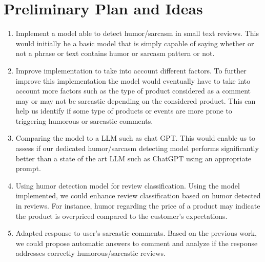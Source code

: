 \documentclass[10pt,twocolumn,letterpaper]{article}
\begin{document}

\section{Preliminary Plan and Ideas}

\begin{enumerate}
    \item Implement a model able to detect humor/sarcasm in small text reviews. This would initially be a basic model that is simply capable of saying whether or not a phrase or text contains humor or sarcasm pattern or not.
    
    \item Improve implementation to take into account different factors. To further improve this implementation the model would eventually have to take into account more factors such as the type of product considered as a comment may or may not be sarcastic depending on the considered product. This can help us identify if some type of products or events are more prone to triggering humorous or sarcastic comments.
    
    \item Comparing the model to a LLM such as chat GPT. This would enable us to assess if our dedicated humor/sarcasm detecting model performs significantly better than a state of the art LLM such as ChatGPT using an appropriate prompt.
    
    \item Using humor detection model for review classification. Using the model implemented, we could enhance review classification based on humor detected in reviews. For instance, humor regarding the price of a product may indicate the product is overpriced compared to the customer’s expectations.
    
    \item Adapted response to user’s sarcastic comments. Based on the previous work, we could propose automatic answers to comment and analyze if the response addresses correctly humorous/sarcastic reviews.
\end{enumerate}


{\small


}
\end{document}
